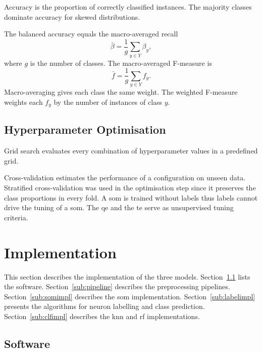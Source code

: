 \documentclass[conference]{IEEEtran}
\begin{document}
Accuracy is the proportion of correctly classified instances.
The majority classes dominate accuracy for skewed distributions.

The balanced accuracy equals the macro-averaged recall
\begin{equation}
\bar{\beta} = \frac{1}{g} \sum_{y \in Y} \beta_y ,
\label{eq:bacc}
\end{equation}
where $g$ is the number of classes.
The macro-averaged F-measure is
\begin{equation}
\bar{f} = \frac{1}{g} \sum_{y \in Y} f_y .
\label{eq:macrof}
\end{equation}
Macro-averaging gives each class the same weight.
The weighted F-measure weights each $f_y$ by the number of instances of class $y$.

\subsection{Hyperparameter Optimisation}
\label{sub:tuning}

Grid search evaluates every combination of hyperparameter values in a predefined grid.

Cross-validation estimates the performance of a configuration on unseen data.
Stratified cross-validation was used in the optimisation step since it preserves the class proportions in every fold.
A \gls{som} is trained without labels thus labels cannot drive the tuning of a \gls{som}.
The \gls{qe} and the \gls{te} serve as unsupervised tuning criteria.


\section{Implementation}
\label{sec:implementation}

This section describes the implementation of the three models.
Section~\ref{sub:software} lists the software.
Section~\ref{sub:pipeline} describes the preprocessing pipelines.
Section~\ref{sub:somimpl} describes the \gls{som} implementation.
Section~\ref{sub:labelimpl} presents the algorithms for neuron labelling and class prediction.
Section~\ref{sub:clfimpl} describes the \gls{knn} and \gls{rf} implementations.

\subsection{Software}
\label{sub:software}
\end{document}
